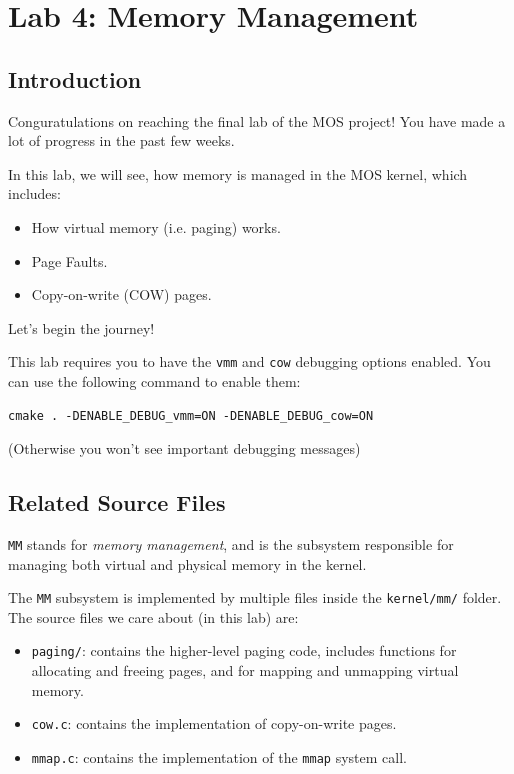 \chapter{Lab 4: Memory Management}

\section{Introduction}

Conguratulations on reaching the final lab of the MOS project! You have
made a lot of progress in the past few weeks.

In this lab, we will see, how memory is managed in the MOS kernel, which includes:

\begin{itemize}
    \item How virtual memory (i.e. paging) works.
    \item Page Faults.
    \item Copy-on-write (COW) pages.
\end{itemize}

Let's begin the journey!

\begin{note}
    \item This lab requires you to have the \texttt{vmm} and \texttt{cow} debugging options
    enabled. You can use the following command to enable them:
    \begin{verbatim}
cmake . -DENABLE_DEBUG_vmm=ON -DENABLE_DEBUG_cow=ON
    \end{verbatim}
    \item (Otherwise you won't see important debugging messages)
\end{note}

\section{Related Source Files}

\texttt{MM} stands for \textit{memory management}, and is the subsystem
responsible for managing both virtual and physical memory in the kernel.

The \texttt{MM} subsystem is implemented by multiple files inside the \texttt{kernel/mm/}
folder. The source files we care about (in this lab) are:

\begin{itemize}
    \item \texttt{paging/}: contains the higher-level paging code, includes functions
          for allocating and freeing pages, and for mapping and unmapping virtual
          memory.
    \item \texttt{cow.c}: contains the implementation of copy-on-write pages.
    \item \texttt{mmap.c}: contains the implementation of the \texttt{mmap} system call.
\end{itemize}


